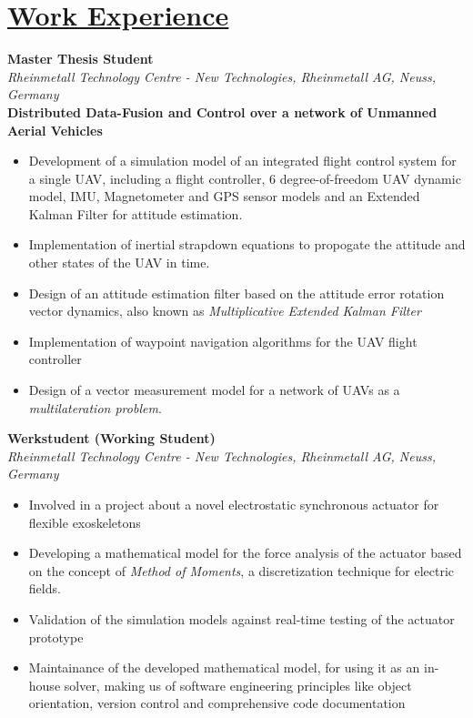 
\section{\underline{Work Experience}}

\large{\textbf{Master Thesis Student}}
\hfill
\masterarbeitdate\\
\large{\emph{Rheinmetall Technology Centre - New Technologies, Rheinmetall AG, Neuss, Germany}}\\
\large{\textbf{Distributed Data-Fusion and Control over a network of Unmanned Aerial Vehicles}}
\begin{itemize}
    \item Development of a simulation model of an integrated flight control system for a single UAV, including a flight controller, 6 degree-of-freedom UAV dynamic model, IMU, Magnetometer and GPS sensor models and an Extended Kalman Filter for attitude estimation.
    \item Implementation of inertial strapdown equations to propogate the attitude and other states of the UAV in time.
    \item Design of an attitude estimation filter based on the attitude error rotation vector dynamics, also known as \emph{Multiplicative Extended Kalman Filter}
    \item Implementation of waypoint navigation algorithms for the UAV flight controller
    \item Design of a vector measurement model for a network of UAVs as a \emph{multilateration problem}.
\end{itemize}

\large{\textbf{Werkstudent (Working Student)}}
\hfill
\rheinmetalldate\\
\large{\emph{Rheinmetall Technology Centre - New Technologies, Rheinmetall AG, Neuss, Germany}}
\begin{itemize}
\item\large{Involved in a project about a novel electrostatic synchronous actuator for flexible exoskeletons}
\item\large{Developing a mathematical model for the force analysis of the actuator based on the concept of \emph{Method of Moments}, a discretization technique for electric fields.}
\item\large{Validation of the simulation models against real-time testing of the actuator prototype}
\item\large{Maintainance of the developed mathematical model, for using it as an in-house solver, making us of software engineering principles like object orientation, version control and comprehensive code documentation}
\end{itemize}


